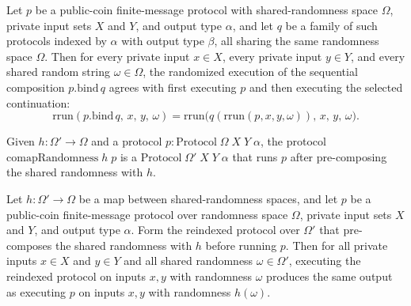\begin{theorem}
\label{CommunicationComplexity.PublicCoin.FiniteMessage.Protocol.bind_rrun}
\leanok
{}
Let $p$ be a public-coin finite-message protocol with shared-randomness space $\Omega$,
private input sets $X$ and $Y$, and output type $\alpha$, and let $q$ be a family of
such protocols indexed by $\alpha$ with output type $\beta$, all sharing the same
randomness space $\Omega$. Then for every private input $x \in X$, every private input
$y \in Y$, and every shared random string $\omega \in \Omega$, the randomized execution
of the sequential composition $p.\mathrm{bind}\,q$ agrees with first executing $p$ and
then executing the selected continuation:
\[
\mathrm{rrun}(p.\mathrm{bind}\,q,\, x,\, y,\, \omega)
  = \mathrm{rrun}\bigl(q(\mathrm{rrun}(p, x, y, \omega)),\, x,\, y,\, \omega\bigr).
\]
\end{theorem}

\begin{definition}
\label{CommunicationComplexity.PublicCoin.FiniteMessage.Protocol.comapRandomness}
\leanok
{}
Given $h : \Omega' \to \Omega$ and a protocol $p : \mathrm{Protocol}\;\Omega\;X\;Y\;\alpha$,
the protocol $\mathrm{comapRandomness}\;h\;p$ is a
$\mathrm{Protocol}\;\Omega'\;X\;Y\;\alpha$ that runs $p$ after pre-composing the shared
randomness with $h$.
\end{definition}

\begin{theorem}
\label{CommunicationComplexity.PublicCoin.FiniteMessage.Protocol.comapRandomness_rrun}
\leanok
{}
Let $h : \Omega' \to \Omega$ be a map between shared-randomness spaces, and let $p$ be a
public-coin finite-message protocol over randomness space $\Omega$, private input sets
$X$ and $Y$, and output type $\alpha$. Form the reindexed protocol over $\Omega'$ that
pre-composes the shared randomness with $h$ before running $p$. Then for all private
inputs $x \in X$ and $y \in Y$ and all shared randomness $\omega \in \Omega'$, executing
the reindexed protocol on inputs $x, y$ with randomness $\omega$ produces the same
output as executing $p$ on inputs $x, y$ with randomness $h(\omega)$.
\end{theorem}

